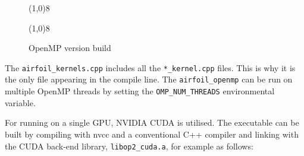 \documentclass[11pt]{article}
\begin{document}
\begin{figure}[!h]\small
\vspace{-0pt}\noindent\line(1,0){8}\vspace{-10pt}
\vspace{-0pt}\noindent\line(1,0){8}\vspace{-10pt}
\caption{\small OpenMP version build }
\normalsize\vspace{-10pt}\label{fig:ompbuild}
\end{figure}


\noindent The \texttt{airfoil\_kernels.cpp} includes all the \texttt{*\_kernel.cpp} files. This is why it is the only
file appearing in the compile line. The \texttt{airfoil\_openmp} can be run on multiple OpenMP threads by setting the
\texttt{OMP\_NUM\_THREADS} environmental variable.\newpage

\noindent For running on a single GPU, NVIDIA CUDA is utilised. The executable can be built by compiling with nvcc and a
conventional C++ compiler and linking with the CUDA back-end library, \texttt{libop2\_cuda.a}, for example as follows:
\end{document}
